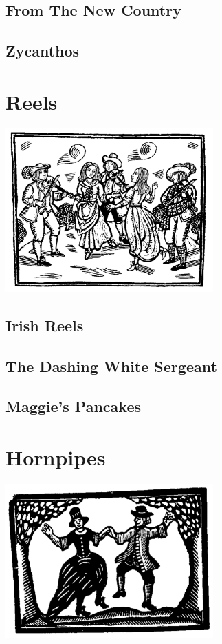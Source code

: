 \documentclass[12pt]{report}
\begin{document}
\section{From The New Country}


\section{Zycanthos}


\chapter{Reels}
\begin{center}
\includegraphics[width=8cm]{../images/reels}
\end{center}

\section{Irish Reels}


\section{The Dashing White Sergeant}


\section{Maggie's Pancakes}


\chapter{Hornpipes}
\begin{center}
\includegraphics[width=8cm]{../images/hornpipes}
\end{center}
\end{document}
